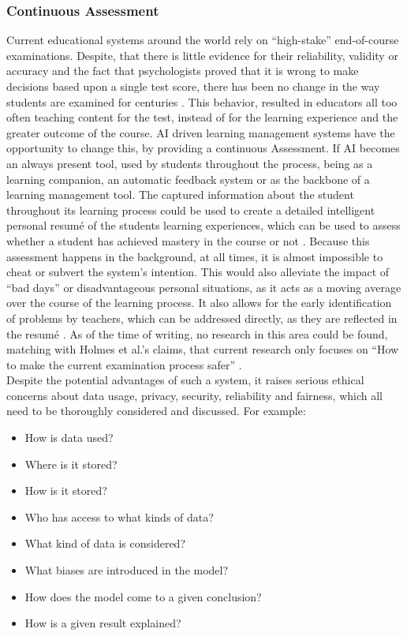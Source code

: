 \documentclass{Academic}
\begin{document}
    \subsubsection{Continuous Assessment}
    Current educational systems around the world rely on \enquote{high-stake} end-of-course examinations. Despite, that there is little evidence for their reliability, validity or accuracy and the fact that psychologists proved that it is wrong to make decisions based upon a single test score, there has been no change in the way students are examined for centuries \cite{holmes_artificial_2023}. This behavior, resulted in educators all too often teaching content for the test, instead of for the learning experience and the greater outcome of the course. AI driven learning management systems have the opportunity to change this, by providing a continuous Assessment. If AI becomes an always present tool, used by students throughout the process, being as a learning companion, an automatic feedback system or as the backbone of a learning management tool. The captured information about the student throughout its learning process could be used to create a detailed intelligent personal resumé of the students learning experiences, which can be used to assess whether a student has achieved mastery in the course or not \cite{holmes_artificial_2023}. Because this assessment happens in the background, at all times, it is almost impossible to cheat or subvert the system's intention. This would also alleviate the impact of \enquote{bad days} or disadvantageous personal situations, as it acts as a moving average over the course of the learning process. It also allows for the early identification of problems by teachers, which can be addressed directly, as they are reflected in the resumé \cite{holmes_artificial_2023}. As of the time of writing, no research in this area could be found, matching with Holmes et al.'s claims, that current research only focuses on \enquote{How to make the current examination process safer} \cite{holmes_artificial_2023}.\\
    Despite the potential advantages of such a system, it raises serious ethical concerns about data usage, privacy, security, reliability and fairness, which all need to be thoroughly considered and discussed. For example:
    \begin{itemize}
        \item How is data used?
        \item Where is it stored?
        \item How is it stored?
        \item Who has access to what kinds of data?
        \item What kind of data is considered?
        \item What biases are introduced in the model?
        \item How does the model come to a given conclusion?
        \item How is a given result explained?
    \end{itemize}
\end{document}
